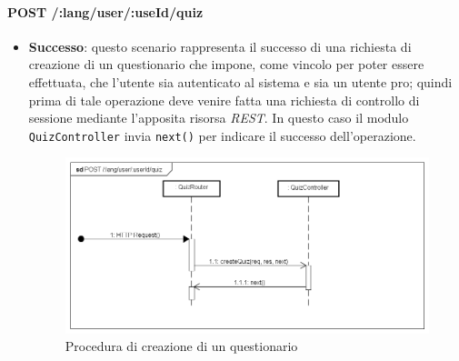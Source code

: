 \paragraph{POST /:lang/user/:useId/quiz} %
\begin{itemize}
\item \textbf{Successo}: questo scenario rappresenta il successo di una richiesta di creazione di un questionario che impone, come vincolo per poter essere effettuata, che l'utente sia autenticato al sistema e sia un utente pro; quindi prima di tale operazione deve venire fatta una richiesta di controllo di sessione mediante l'apposita risorsa \textit{REST}. In questo caso il modulo \texttt{QuizController} invia \texttt{next()} per indicare il successo dell'operazione.
\label{Procedura di creazione di un questionario}
\begin{figure}[ht]
	\centering
	\includegraphics[scale=0.55]{UML/DiagrammiDiSequenza/Back-end/POST__lang_user_userId_quiz_success.png}
	\caption{Procedura di creazione di un questionario}
\end{figure}
\FloatBarrier


\end{itemize}
